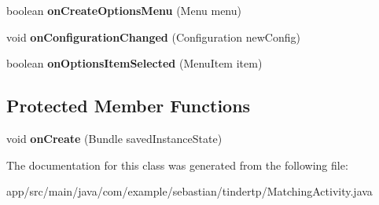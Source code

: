 \begin{DoxyCompactItemize}
\item 
boolean {\bfseries on\+Create\+Options\+Menu} (Menu menu)\hypertarget{classcom_1_1example_1_1sebastian_1_1tindertp_1_1MatchingActivity_a301572938da6e70bebd04c3da35a56da}{}\label{classcom_1_1example_1_1sebastian_1_1tindertp_1_1MatchingActivity_a301572938da6e70bebd04c3da35a56da}

\item 
void {\bfseries on\+Configuration\+Changed} (Configuration new\+Config)\hypertarget{classcom_1_1example_1_1sebastian_1_1tindertp_1_1MatchingActivity_ae062bcb1b53dd363eba0cc51798f34de}{}\label{classcom_1_1example_1_1sebastian_1_1tindertp_1_1MatchingActivity_ae062bcb1b53dd363eba0cc51798f34de}

\item 
boolean {\bfseries on\+Options\+Item\+Selected} (Menu\+Item item)\hypertarget{classcom_1_1example_1_1sebastian_1_1tindertp_1_1MatchingActivity_ab6f76188e481dbd4aedc4f61aba5617d}{}\label{classcom_1_1example_1_1sebastian_1_1tindertp_1_1MatchingActivity_ab6f76188e481dbd4aedc4f61aba5617d}

\end{DoxyCompactItemize}
\subsection*{Protected Member Functions}
\begin{DoxyCompactItemize}
\item 
void {\bfseries on\+Create} (Bundle saved\+Instance\+State)\hypertarget{classcom_1_1example_1_1sebastian_1_1tindertp_1_1MatchingActivity_aef2b068e4e7e5c39e1314cc07fc2e7aa}{}\label{classcom_1_1example_1_1sebastian_1_1tindertp_1_1MatchingActivity_aef2b068e4e7e5c39e1314cc07fc2e7aa}

\end{DoxyCompactItemize}


The documentation for this class was generated from the following file\+:\begin{DoxyCompactItemize}
\item 
app/src/main/java/com/example/sebastian/tindertp/Matching\+Activity.\+java\end{DoxyCompactItemize}
